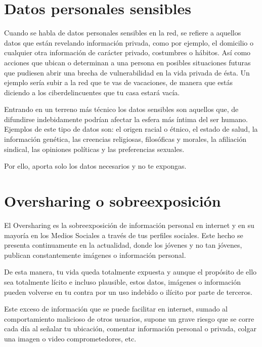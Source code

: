\documentclass[
  spanish,
  a4paper,
  openany]{book}
\begin{document}
\hypertarget{datos-personales-sensibles}{%
\section{Datos personales sensibles}\label{datos-personales-sensibles}}

Cuando se habla de datos personales sensibles en la red, se refiere a aquellos datos que están revelando información privada, como por ejemplo, el domicilio o cualquier otra información de carácter privado, costumbres o hábitos. Así como acciones que ubican o determinan a una persona en posibles situaciones futuras que pudiesen abrir una brecha de vulnerabilidad en la vida privada de ésta. Un ejemplo sería subir a la red que te vas de vacaciones, de manera que estás diciendo a los ciberdelincuentes que tu casa estará vacía.

Entrando en un terreno más técnico los datos sensibles son aquellos que, de difundirse indebidamente podrían afectar la esfera más íntima del ser humano. Ejemplos de este tipo de datos son: el origen racial o étnico, el estado de salud, la información genética, las creencias religiosas, filosóficas y morales, la afiliación sindical, las opiniones políticas y las preferencias sexuales.

Por ello, aporta solo los datos necesarios y no te expongas.

\hypertarget{oversharing-o-sobreexposiciuxf3n}{%
\section{Oversharing o sobreexposición}\label{oversharing-o-sobreexposiciuxf3n}}

El Oversharing es la sobreexposición de información personal en internet y en su mayoría en los Medios Sociales a través de tus perfiles sociales. Este hecho se presenta continuamente en la actualidad, donde los jóvenes y no tan jóvenes, publican constantemente imágenes o información personal.

De esta manera, tu vida queda totalmente expuesta y aunque el propósito de ello sea totalmente lícito e incluso plausible, estos datos, imágenes o información pueden volverse en tu contra por un uso indebido o ilícito por parte de terceros.

Este exceso de información que se puede facilitar en internet, sumado al comportamiento malicioso de otros usuarios, supone un grave riesgo que se corre cada día al señalar tu ubicación, comentar información personal o privada, colgar una imagen o video comprometedores, etc.
\end{document}

